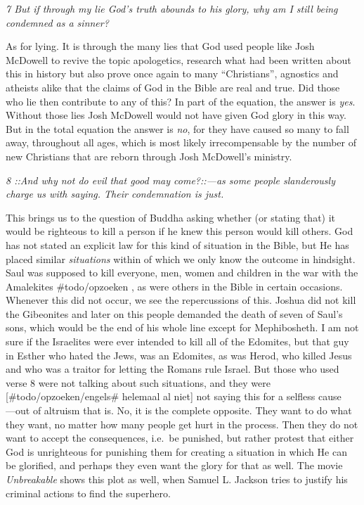 \emph{7 But if through my lie God's truth abounds to his glory, why am I
still being condemned as a sinner?}

As for lying. It is through the many lies that God used people like Josh
McDowell to revive the topic apologetics, research what had been written
about this in history but also prove once again to many ``Christians'',
agnostics and atheists alike that the claims of God in the Bible are
real and true. Did those who lie then contribute to any of this? In part
of the equation, the answer is \emph{yes}. Without those lies Josh
McDowell would not have given God glory in this way. But in the total
equation the answer is \emph{no}, for they have caused so many to fall
away, throughout all ages, which is most likely irrecompensable by the
number of new Christians that are reborn through Josh McDowell's
ministry.

\emph{8 ::And why not do evil that good may come?::---as some people
slanderously charge us with saying. Their condemnation is just.}

This brings us to the question of Buddha asking whether (or stating
that) it would be righteous to kill a person if he knew this person
would kill others. God has not stated an explicit law for this kind of
situation in the Bible, but He has placed similar \emph{situations}
within of which we only know the outcome in hindsight. Saul was supposed
to kill everyone, men, women and children in the war with the Amalekites
\#todo/opzoeken , as were others in the Bible in certain occasions.
Whenever this did not occur, we see the repercussions of this. Joshua
did not kill the Gibeonites and later on this people demanded the death
of seven of Saul's sons, which would be the end of his whole line except
for Mephibosheth. I am not sure if the Israelites were ever intended to
kill all of the Edomites, but that guy in Esther who hated the Jews, was
an Edomites, as was Herod, who killed Jesus and who was a traitor for
letting the Romans rule Israel. But those who used verse 8 were not
talking about such situations, and they were {[}\#todo/opzoeken/engels\#
helemaal al niet{]} not saying this for a selfless cause\\
---out of altruism that is. No, it is the complete opposite. They want
to do what they want, no matter how many people get hurt in the process.
Then they do not want to accept the consequences, i.e.~be punished, but
rather protest that either God is unrighteous for punishing them for
creating a situation in which He can be glorified, and perhaps they even
want the glory for that as well. The movie \emph{Unbreakable} shows this
plot as well, when Samuel L. Jackson tries to justify his criminal
actions to find the superhero.

